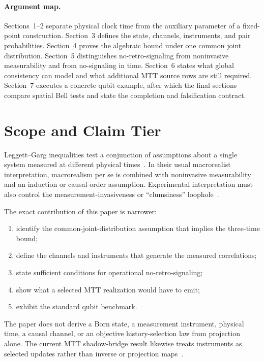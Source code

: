 \documentclass[11pt]{article}
\theoremstyle{definition}
\theoremstyle{remark}
\begin{document}
\paragraph{Argument map.}
Sections~1--2 separate physical clock time from the auxiliary parameter of a
fixed-point construction.  Section~3 defines the state, channels, instruments,
and pair probabilities.  Section~4 proves the algebraic bound under one
common joint distribution.  Section~5 distinguishes no-retro-signaling from
noninvasive measurability and from no-signaling in time.  Section~6 states
what global consistency can model and what additional MTT source rows are
still required.  Section~7 executes a concrete qubit example, after which the
final sections compare spatial Bell tests and state the completion and
falsification contract.

\tableofcontents

\section{Scope and Claim Tier}

Leggett--Garg inequalities test a conjunction of assumptions about a single
system measured at different physical times~\cite{LeggettGarg1985}.  In their
usual macrorealist interpretation, macrorealism per se is combined with
noninvasive measurability and an induction or causal-order assumption.
Experimental interpretation must also control the measurement-invasiveness
or ``clumsiness'' loophole~\cite{WildeMizel2012,EmaryLambertNori2014}.

The exact contribution of this paper is narrower:
\begin{enumerate}[label=\arabic*.]
\item identify the common-joint-distribution assumption that implies the
  three-time bound;
\item define the channels and instruments that generate the measured
  correlations;
\item state sufficient conditions for operational no-retro-signaling;
\item show what a selected MTT realization would have to emit;
\item exhibit the standard qubit benchmark.
\end{enumerate}

The paper does not derive a Born state, a measurement instrument, physical
time, a causal channel, or an objective history-selection law from projection
alone.  The current MTT shadow-bridge result likewise treats instruments as
selected updates rather than inverse or projection maps~\cite{NeroShadowBridge}.
\end{document}
